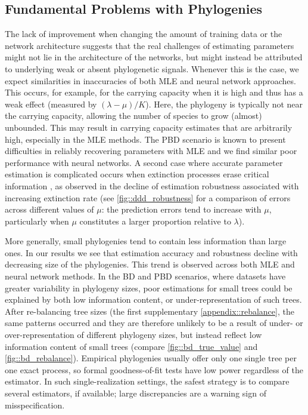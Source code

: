{\subsection{Fundamental Problems with Phylogenies}
\label{ch2::sec::discussion::fundamental_problems}
The lack of improvement when changing the amount of training data or the network architecture suggests that the real challenges of estimating parameters might not lie in the architecture of the networks, but might instead be attributed to underlying weak or absent phylogenetic signals. Whenever this is the case, we expect similarities in inaccuracies of both MLE and neural network approaches. This occurs, for example, for the carrying capacity when it is high and thus has a weak effect (measured by $(\lambda - \mu)/K$). Here, the phylogeny is typically not near the carrying capacity, allowing the number of species to grow (almost) unbounded. This may result in carrying capacity estimates that are arbitrarily high, especially in the MLE methods. The PBD scenario is known to present difficulties in reliably recovering parameters with MLE \citep{etienne_estimating_2014} and we find similar poor performance with neural networks. A second case where accurate parameter estimation is complicated occurs when extinction processes erase critical information \citep{louca_why_2021}, as observed in the decline of estimation robustness associated with increasing extinction rate (see \autoref{fig::ddd_robustness} for a comparison of errors across different values of $\mu$: the prediction errors tend to increase with $\mu$, particularly when $\mu$ constitutes a larger proportion relative to $\lambda$). 

More generally, small phylogenies tend to contain less information than large ones. In our results we see that estimation accuracy and robustness decline with decreasing size of the phylogenies. This trend is observed across both MLE and neural network methods. In the BD and PBD scenarios, where datasets have greater variability in phylogeny sizes, poor estimations for small trees could be explained by both low information content, or under-representation of such trees. After re-balancing tree sizes (the first supplementary \autoref{appendix::rebalance}, the same patterns occurred and they are therefore unlikely to be a result of under- or over-representation of different phylogeny sizes, but instead reflect low information content of small trees (compare \autoref{fig::bd_true_value} and \autoref{fig::bd_rebalance}). Empirical phylogenies usually offer only one single tree per one exact process, so formal goodness-of-fit tests have low power regardless of the estimator. In such single-realization settings, the safest strategy is to compare several estimators, if available; large discrepancies are a warning sign of misspecification.

}
